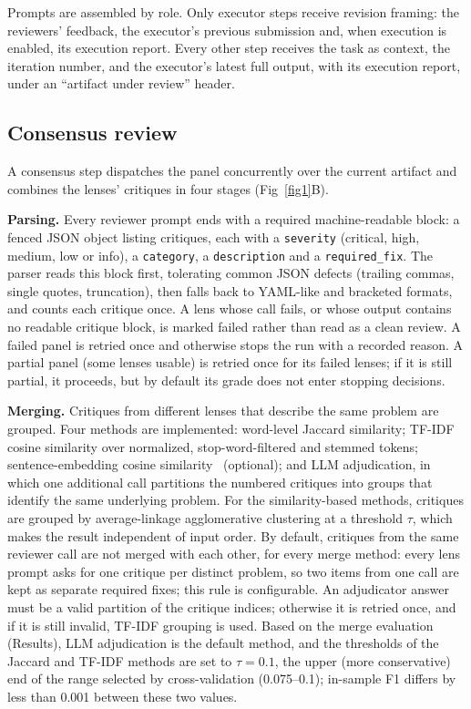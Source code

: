 \documentclass[10pt,letterpaper]{article}
\begin{document}
Prompts are assembled by role. Only executor steps receive revision framing: the reviewers' feedback, the executor's previous submission and, when execution is enabled, its execution report. Every other step receives the task as context, the iteration number, and the executor's latest full output, with its execution report, under an ``artifact under review'' header.

\subsection*{Consensus review}

A consensus step dispatches the panel concurrently over the current artifact and combines the lenses' critiques in four stages (Fig~\ref{fig1}B).

\textbf{Parsing.} Every reviewer prompt ends with a required machine-readable block: a fenced JSON object listing critiques, each with a \texttt{severity} (critical, high, medium, low or info), a \texttt{category}, a \texttt{description} and a \texttt{required\_fix}. The parser reads this block first, tolerating common JSON defects (trailing commas, single quotes, truncation), then falls back to YAML-like and bracketed formats, and counts each critique once. A lens whose call fails, or whose output contains no readable critique block, is marked failed rather than read as a clean review. A failed panel is retried once and otherwise stops the run with a recorded reason. A partial panel (some lenses usable) is retried once for its failed lenses; if it is still partial, it proceeds, but by default its grade does not enter stopping decisions.

\textbf{Merging.} Critiques from different lenses that describe the same problem are grouped. Four methods are implemented: word-level Jaccard similarity; TF-IDF cosine similarity over normalized, stop-word-filtered and stemmed tokens; sentence-embedding cosine similarity~\cite{reimers2019sbert} (optional); and LLM adjudication, in which one additional call partitions the numbered critiques into groups that identify the same underlying problem. For the similarity-based methods, critiques are grouped by average-linkage agglomerative clustering at a threshold $\tau$, which makes the result independent of input order. By default, critiques from the same reviewer call are not merged with each other, for every merge method: every lens prompt asks for one critique per distinct problem, so two items from one call are kept as separate required fixes; this rule is configurable. An adjudicator answer must be a valid partition of the critique indices; otherwise it is retried once, and if it is still invalid, TF-IDF grouping is used. Based on the merge evaluation (Results), LLM adjudication is the default method, and the thresholds of the Jaccard and TF-IDF methods are set to $\tau=0.1$, the upper (more conservative) end of the range selected by cross-validation (0.075--0.1); in-sample F1 differs by less than 0.001 between these two values.
\end{document}
